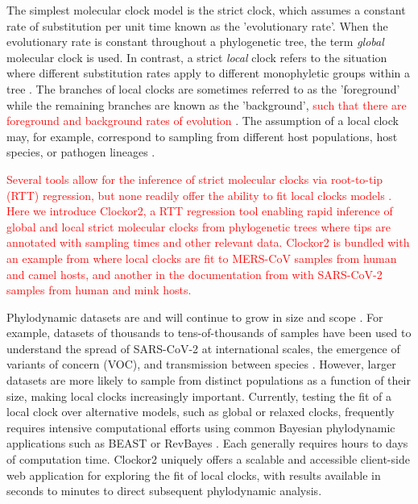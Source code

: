 \documentclass{article}
\begin{document}
The simplest molecular clock model is the strict clock, which assumes a constant rate of substitution per unit time known as the 'evolutionary rate'. When the evolutionary rate is constant throughout a phylogenetic tree, the term \emph{global} molecular clock is used. In contrast, a strict \emph{local} clock refers to the situation where different substitution rates apply to different monophyletic groups within a tree \citep{ho2014molecular}. The branches of local clocks are sometimes referred to as the 'foreground' while the remaining branches are known as the 'background', \textcolor{red}{such that there are foreground and background rates of evolution} \citep{yoder2000estimation}. The assumption of a local clock may, for example, correspond to  sampling from different host populations, host species, or pathogen lineages \citep{worobey_synchronized_2014}. 

\textcolor{red}{Several tools allow for the inference of strict molecular clocks via root-to-tip (RTT) regression, but none readily offer the ability to fit local clocks models \citep{rambaut_exploring_2016, hadfield_nextstrain_2018,sagulenko_treetime_2018,volz_scalable_2017}. Here we introduce Clockor2, a RTT regression tool enabling rapid inference of global and local strict molecular clocks from phylogenetic trees where tips are annotated with sampling times and other relevant data. Clockor2 is bundled with an example from \citet{dudas_mers-cov_2018} where local clocks are fit to MERS-CoV samples from human and camel hosts, and another in the documentation from \citet{porter2023evolutionary} with SARS-CoV-2 samples from human and mink hosts.}

Phylodynamic datasets are and will continue to grow in size and scope \citep{featherstone2022epidemiological}. For example, datasets of thousands to tens-of-thousands of samples have been used to understand the spread of SARS-CoV-2 at international scales, the emergence of variants of concern (VOC), and transmission between species \citep{du_plessis_establishment_2021,hill_origins_2022,nadeau_swiss_2023,porter2023evolutionary}. However, larger datasets are more likely to sample from distinct populations as a function of their size, making local clocks increasingly important. Currently, testing the fit of a local clock over alternative models, such as global or relaxed clocks, frequently requires intensive computational efforts using common Bayesian phylodynamic applications such as BEAST or RevBayes \citep{bouckaert_beast_2019, suchard_bayesian_2018, hoehna_2016_revbayes, drummond2007beast, drummond2012bayesian}. Each generally requires hours to days of computation time. Clockor2 uniquely offers a scalable and accessible client-side web application for exploring the fit of local clocks, with results available in seconds to minutes to direct subsequent phylodynamic analysis.
\end{document}
